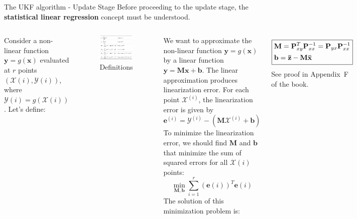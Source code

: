 \begin{frame}{The UKF algorithm - Update Stage}
Before proceeding to the update stage, 
the \textbf{statistical linear regression} concept must be understood.
\begin{columns}
Consider a non-linear function $\mathbf{y} = g(\mathbf{x})$ evaluated at $r$ points $(\mathbf{\mathcal{X}}(i), \mathbf{\mathcal{Y}}(i))$, where $\mathbf{\mathcal{Y}}(i) = g(\mathbf{\mathcal{X}}(i))$.
Let's define:
\begin{figure}
    \centering
    \includegraphics[width=0.9\linewidth]{Figures//Part3/StatisticalLinearRegression.png}
    \vspace{-10pt}
    \caption{Definitions}
\end{figure}
We want to approximate the non-linear function $\mathbf{y} = g(\mathbf{x})$ by a linear function
$\mathbf{y} = \mathbf{M}\mathbf{x} + \mathbf{b}$.
The linear approximation produces linearization error. For each point $\mathbf{\mathcal{X}}^{(i)}$, the
linearization error is given by
\[
\mathbf{e}^{(i)} = \mathbf{\mathcal{Y}}^{(i)} - (\mathbf{M}\mathbf{\mathcal{X}}^{(i)} + \mathbf{b})
\]
To minimize the linearization error, we should find $\mathbf{M}$ and $\mathbf{b}$ that minimize the sum
of squared errors for all $\mathbf{\mathcal{X}}(i)$ points:
\[
\min_{\mathbf{M},\mathbf{b}} \sum_{i=1}^{r} (\mathbf{e}(i))^T \mathbf{e}(i)
\]
The solution of this minimization problem is:

$$\boxed{
\begin{aligned}
& \mathbf{M} = \mathbf{P}_{xy}^T \mathbf{P}_{xx}^{-1} = \mathbf{P}_{yx} \mathbf{P}_{xx}^{-1}\\
& \mathbf{b} = \mathbf{\Bar{z}} - \mathbf{M\Bar{x}}
\end{aligned}
}$$
{\footnotesize See proof in Appendix~F of the book.}

\end{columns}
\end{frame}


